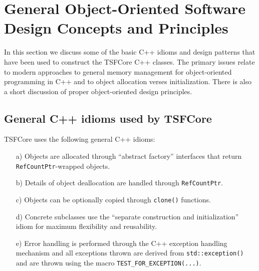 %
\section{General Object-Oriented Software Design Concepts and Principles}
\label{tsfcore:sec:general_software_concepts}
%
 
In this section we discuss some of the basic C++ idioms and design
patterns that have been used to construct the TSFCore C++ classes.
The primary issues relate to modern approaches to general memory
management for object-oriented programming in C++ and to object
allocation verses initialization.  There is also a short discussion of
proper object-oriented design principles.

%
\subsection{General C++ idioms used by TSFCore}
\label{tsfcore:sec:tsfcore-c++-idioms}
%

TSFCore uses the following general C++ idioms:

\begin{enumerate}

{}\item[a)] Objects are allocated through ``abstract factory'' interfaces
that return {}\texttt{Ref\-Count\-Ptr}-wrapped objects.

{}\item[b)] Details of object deallocation are handled through
{}\texttt{Ref\-Count\-Ptr}.

{}\item[c)] Objects can be optionally copied through {}\texttt{clone()}
functions.

{}\item[d)] Concrete subclasses use the ``separate construction and
initialization'' idiom for maximum flexibility and reusability.

{}\item[e)] Error handling is performed through the C++ exception
handling mechanism and all exceptions thrown are derived from
{}\texttt{std\-::exception()} and are thrown using the macro
{}\texttt{TEST\-\_FOR\-\_EXCEPTION(...)}.

\end{enumerate}

